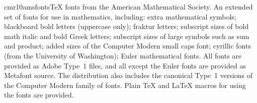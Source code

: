 \documentclass{ddltxtyp}
\begin{document}
\begin{package}{cmr10}{amsfonts}{{\TeX} fonts from the American Mathematical Society.}
An extended set of fonts for use in mathematics, including:
extra mathematical symbols; blackboard bold letters (uppercase
only); fraktur letters; subscript sizes of bold math italic and
bold Greek letters; subscript sizes of large symbols such as
sum and product; added sizes of the Computer Modern small caps
font; cyrillic fonts (from the University of Washington); Euler
mathematical fonts. All fonts are provided as Adobe Type~1
files, and all except the Euler fonts are provided as Metafont
source. The distribution also includes the canonical Type~1
versions of the Computer Modern family of fonts. Plain {\TeX} and
{\LaTeX} macros for using the fonts are provided.
\end{package}
\end{document}

